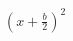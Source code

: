 \documentclass[preview]{standalone}
\begin{document}
\begin{align*}
(x + \frac{b}{2})^2
\end{align*}
\end{document}
